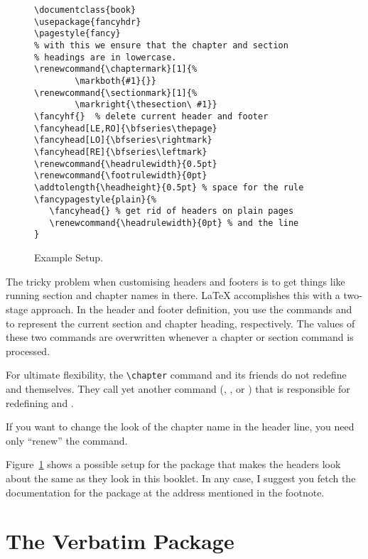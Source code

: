 \begin{figure}[!htbp]
\begin{lined}{\textwidth}
\begin{verbatim}
\documentclass{book}
\usepackage{fancyhdr}
\pagestyle{fancy}
% with this we ensure that the chapter and section
% headings are in lowercase.
\renewcommand{\chaptermark}[1]{%
        \markboth{#1}{}}
\renewcommand{\sectionmark}[1]{%
        \markright{\thesection\ #1}}
\fancyhf{}  % delete current header and footer
\fancyhead[LE,RO]{\bfseries\thepage}
\fancyhead[LO]{\bfseries\rightmark}
\fancyhead[RE]{\bfseries\leftmark}
\renewcommand{\headrulewidth}{0.5pt}
\renewcommand{\footrulewidth}{0pt}
\addtolength{\headheight}{0.5pt} % space for the rule
\fancypagestyle{plain}{%
   \fancyhead{} % get rid of headers on plain pages
   \renewcommand{\headrulewidth}{0pt} % and the line
}
\end{verbatim}
\end{lined}
\caption{Example  Setup.} \label{fancyhdr}
\end{figure}

The tricky problem when customising headers and footers is to get
things like running section and chapter names in there. \LaTeX{}
accomplishes this with a two-stage approach. In the header and footer
definition, you use the commands  and  to
represent the current section and chapter heading, respectively.
The values of these two commands are overwritten whenever a chapter or
section command is processed.

For ultimate flexibility, the \verb|\chapter| command and its friends
do not redefine  and  themselves. They call
yet another command (, , or
) that is responsible for redefining 
and .

If you want to change the look of the chapter
name in the header line, you need only ``renew'' the 
command. 


Figure~\ref{fancyhdr} shows a possible setup for the 
package that makes the headers look about the same as they look in
this booklet. In any case, I suggest you fetch the documentation for
the package at the address mentioned in the footnote.

\section{The Verbatim Package}

